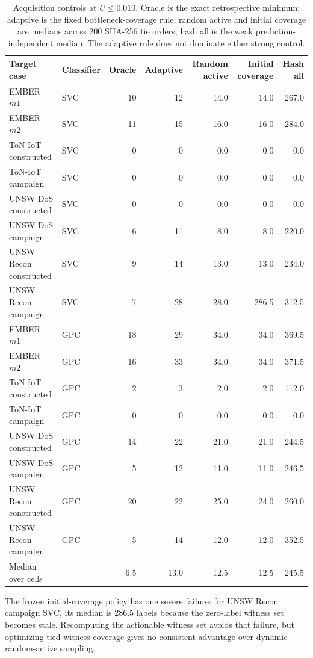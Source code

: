 \documentclass[11pt]{article}
\begin{document}
\begin{table}[H]
\centering
\caption{Acquisition controls at $U\leq0.010$. Oracle is the exact
retrospective minimum; adaptive is the fixed bottleneck-coverage rule; random
active and initial coverage are medians across 200 SHA-256 tie orders; hash
all is the weak prediction-independent median. The adaptive rule does not
dominate either strong control.}
\label{supp:tab_v9_acquisition}
\scriptsize
\setlength{\tabcolsep}{3.2pt}
\begin{tabular}{llrrrrr}
\toprule
Target case & Classifier & Oracle & Adaptive & Random active & Initial coverage & Hash all\\
\midrule
EMBER $m1$ & SVC & 10 & 12 & 14.0 & 14.0 & 267.0\\
EMBER $m2$ & SVC & 11 & 15 & 16.0 & 16.0 & 284.0\\
ToN-IoT constructed & SVC & 0 & 0 & 0.0 & 0.0 & 0.0\\
ToN-IoT campaign & SVC & 0 & 0 & 0.0 & 0.0 & 0.0\\
UNSW DoS constructed & SVC & 0 & 0 & 0.0 & 0.0 & 0.0\\
UNSW DoS campaign & SVC & 6 & 11 & 8.0 & 8.0 & 220.0\\
UNSW Recon constructed & SVC & 9 & 14 & 13.0 & 13.0 & 234.0\\
UNSW Recon campaign & SVC & 7 & 28 & 28.0 & 286.5 & 312.5\\
\addlinespace
EMBER $m1$ & GPC & 18 & 29 & 34.0 & 34.0 & 369.5\\
EMBER $m2$ & GPC & 16 & 33 & 34.0 & 34.0 & 371.5\\
ToN-IoT constructed & GPC & 2 & 3 & 2.0 & 2.0 & 112.0\\
ToN-IoT campaign & GPC & 0 & 0 & 0.0 & 0.0 & 0.0\\
UNSW DoS constructed & GPC & 14 & 22 & 21.0 & 21.0 & 244.5\\
UNSW DoS campaign & GPC & 5 & 12 & 11.0 & 11.0 & 246.5\\
UNSW Recon constructed & GPC & 20 & 22 & 25.0 & 24.0 & 260.0\\
UNSW Recon campaign & GPC & 5 & 14 & 12.0 & 12.0 & 352.5\\
\midrule
Median over cells & & 6.5 & 13.0 & 12.5 & 12.5 & 245.5\\
\bottomrule
\end{tabular}
\end{table}

The frozen initial-coverage policy has one severe failure: for UNSW Recon
campaign SVC, its median is 286.5 labels because the zero-label witness set
becomes stale. Recomputing the actionable witness set avoids that failure,
but optimizing tied-witness coverage gives no consistent advantage over
dynamic random-active sampling.
\end{document}
